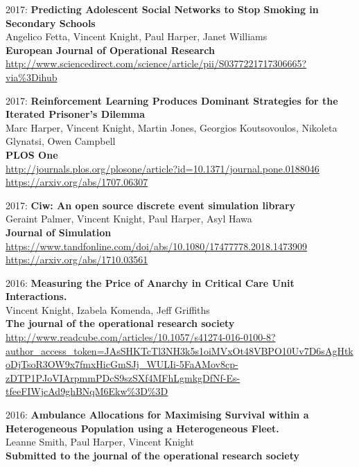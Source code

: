 \documentclass[10pt]{res} %
\begin{document}
\begin{resume}
\begin{etaremune}
\item
2017: \textbf{Predicting Adolescent Social Networks to Stop Smoking in Secondary Schools}\\
Angelico Fetta, Vincent Knight, Paul Harper, Janet Williams
\\
\textbf{European Journal of Operational Research}
\\
\url{http://www.sciencedirect.com/science/article/pii/S0377221717306665?via%3Dihub}
\\

\item
2017: \textbf{Reinforcement Learning Produces Dominant Strategies for the Iterated Prisoner's Dilemma}\\
Marc Harper, Vincent Knight, Martin Jones, Georgios Koutsovoulos, Nikoleta Glynatsi, Owen Campbell
\\
\textbf{PLOS One}
\\
\url{http://journals.plos.org/plosone/article?id=10.1371/journal.pone.0188046}
\\
\url{https://arxiv.org/abs/1707.06307}
\\

\item
2017: \textbf{Ciw: An open source discrete event simulation library}\\
Geraint Palmer, Vincent Knight, Paul Harper, Asyl Hawa
\\
\textbf{Journal of Simulation}
\\
\url{https://www.tandfonline.com/doi/abs/10.1080/17477778.2018.1473909}
\\
\url{https://arxiv.org/abs/1710.03561}
\\

\item
2016: \textbf{Measuring the Price of Anarchy in Critical Care Unit Interactions.}\\
Vincent Knight, Izabela Komenda, Jeff Griffiths
\\
\textbf{The journal of the operational research society}
\\
\url{http://www.readcube.com/articles/10.1057/s41274-016-0100-8?author_access_token=JAsSHKTcTl3NH3k5s1oiMVxOt48VBPO10Uv7D6sAgHtkoDjTsoR3OW9x7fmxHicGmSJj_WULIi-5FaAMov8cp-zDTP1PJoVIArpmmPDcS9szSXf4MFhLgmkgDfNf-Es-tfeeFIWjcAd9ghBNqM6Ekw%3D%3D}
\\

\item
2016: \textbf{Ambulance Allocations for Maximising Survival within a Heterogeneous Population using a Heterogeneous Fleet.}\\
Leanne Smith, Paul Harper, Vincent Knight
\\
\textbf{Submitted to the journal of the operational research society}
\\


\end{etaremune}
\end{resume}
\end{document}
